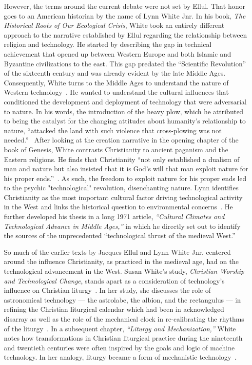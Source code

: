 However, the terms around the current debate were not set by Ellul. That honor goes to an American historian by the name of Lynn White Jnr. In his book, \textit{The Historical Roots of Our Ecological Crisis}, White took an entirely different approach to the narrative established by Ellul regarding the relationship between religion and technology. He started by describing the gap in technical achievement that opened up between Western Europe and both Islamic and Byzantine civilizations to the east. This gap predated the “Scientific Revolution” of the sixteenth century and was already evident by the late Middle Ages. Consequently, White turns to the Middle Ages to understand the nature of Western technology~\cite{Sacasas}. He wanted to understand the cultural influences that conditioned the development and deployment of technology that were adversarial to nature. In his words, the introduction of the heavy plow, which he attributed to being the catalyst for the changing attitudes about humanity’s relationship to nature, “attacked the land with such violence that cross-plowing was not needed.”~\cite{Sacasas} After looking at the creation narrative in the opening chapter of the book of Genesis, White contrasts Christianity to ancient paganism and the Eastern religions. He finds that Christianity “not only established a dualism of man and nature but also insisted that it is God’s will that man exploit nature for his proper ends.”~\cite{Sacasas}. As such, the freedom to exploit nature for his proper ends led to the psychic "technological" revolution, disenchanting nature. Lynn identifies  Christianity as the most important cultural factor driving technological activity in the West and links the historical question to environmental concerns~\cite{Sacasas}. He further developed his thesis in a long 1971 article, \textit{“Cultural Climates and Technological Advance in Middle Ages,”} in which he directly set out to identify the sources of the unprecedented “technological thrust of the medieval West.”~\cite{Sacasas}

So much of the earlier texts by Jacques Ellul and Lynn White Jnr. centered around the influence Christianity, as practiced in the medieval age, had on the technological advancement in the West. Susan White’s study, \textit{Christian Worship and Technological Change}, stands apart as a consideration of technology’s influence on Christian liturgy~\cite{Sacasas}. In her study, she discusses the role of astronomical technology — the astrolabe, the albion, and the rectangulus — in refining the Christian liturgical calendar which had been in acknowledged disarray as well as the role of the mechanical clock in re-calibrating the rhythms of the liturgy~\cite{Sacasas}. In a subsequent chapter, \textit{“Liturgy and Mechanization,”} White notes how transformations in Christian liturgical practice during the nineteenth and twentieth centuries were often inspired by the goals and logic of machine technology. In her analogy, liturgy became a form of mechanistic technology~\cite{Sacasas}.

